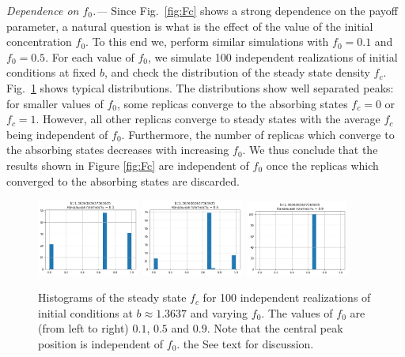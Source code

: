 \documentclass[a4paper]{jpconf}
\begin{document}
\emph{Dependence on $f_0$.---} Since Fig.\ \ref{fig:Fc} shows a strong dependence on the payoff parameter, a natural question is what is the effect of the value of the initial concentration $f_0$. To this end we, perform similar simulations with
$f_0 = 0.1$ and $f_0 = 0.5$. For each value of $f_0$, we simulate 100 independent realizations of initial conditions at fixed $b$, and check the distribution of the steady state density $f_c$. Fig.\ \ref{fig:Fc0_hist} shows typical distributions. The distributions show well separated peaks: for smaller values of $f_0$, some replicas converge to the absorbing states $f_c = 0$ or $f_c = 1$. However, all other replicas converge to steady states with the average $f_c$ being independent of $f_0$. Furthermore, the number of replicas which converge to the absorbing states decreases with increasing $f_0$. We thus conclude that the results shown in Figure \ref{fig:Fc} are independent of $f_0$ once the replicas which converged to the absorbing states are discarded.


\begin{figure}[h]
\includegraphics[width=0.3\textwidth]{b1,3_Fc0,1_hist.png} %
\includegraphics[width=0.3\textwidth]{b1,3_Fc0,5_hist.png} %
\includegraphics[width=0.3\textwidth]{b1,3_Fc0,9_hist.png}
%	
\caption{Histograms of the steady state $f_c$ for 100 independent realizations of initial conditions at $b\approx 1.3637$ and varying $f_0$. The values of $f_0$ are (from left to right) $0.1$, $0.5$ and $0.9$. Note that the central peak position is independent of $f_0$. the See text for discussion.}
\label{fig:Fc0_hist}
\end{figure}
\end{document}
